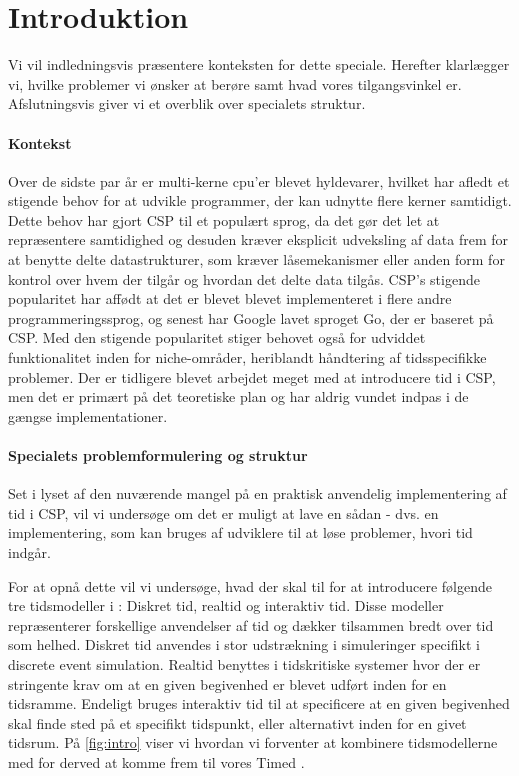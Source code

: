 \chapter{Introduktion}
Vi vil indledningsvis præsentere konteksten for dette speciale. Herefter klarlægger vi, hvilke problemer vi ønsker at berøre samt hvad vores tilgangsvinkel er. Afslutningsvis giver vi et overblik over specialets struktur. 

\subsubsection{Kontekst}
Over de sidste par år er multi-kerne cpu'er blevet hyldevarer, hvilket har afledt et stigende behov for at udvikle programmer, der kan udnytte flere kerner samtidigt. Dette behov har gjort CSP til et populært sprog, da det gør det let at repræsentere samtidighed og desuden kræver eksplicit udveksling af data frem for at benytte delte datastrukturer, som kræver låsemekanismer eller anden form for kontrol over hvem der tilgår og hvordan det delte data tilgås. CSP's stigende popularitet har affødt at det er blevet blevet implementeret i flere andre programmeringssprog, og senest har Google lavet sproget Go, der er baseret på CSP. Med den stigende popularitet stiger behovet også for udviddet funktionalitet inden for niche-områder, heriblandt håndtering af tidsspecifikke problemer. Der er tidligere blevet arbejdet meget med at introducere tid i CSP, men det er primært på det teoretiske plan og har aldrig vundet indpas i de gængse implementationer. 

\subsubsection{Specialets problemformulering og struktur}
Set i lyset af den nuværende mangel på en praktisk anvendelig implementering af tid i CSP, vil vi undersøge om det er muligt at lave en sådan - dvs. en implementering, som kan bruges af udviklere til at løse problemer, hvori tid indgår.

For at opnå dette vil vi undersøge, hvad der skal til for at introducere følgende tre tidsmodeller i \pycsp: Diskret tid, realtid og interaktiv tid. Disse modeller repræsenterer forskellige anvendelser af tid og dækker tilsammen bredt over tid som helhed. Diskret tid anvendes i stor udstrækning i simuleringer specifikt i discrete event simulation. Realtid benyttes i tidskritiske systemer hvor der er stringente krav om at en given begivenhed er blevet udført inden for en tidsramme. Endeligt bruges interaktiv tid til at specificere at en given begivenhed skal finde sted på et specifikt tidspunkt, eller alternativt inden for en givet tidsrum. På \cref{fig:intro} viser vi hvordan vi forventer at kombinere tidsmodellerne med \pycsp for derved at komme frem til vores Timed \pycsp. 

